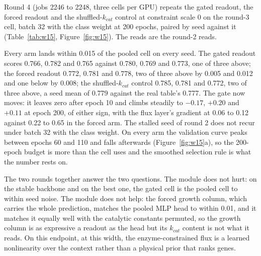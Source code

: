 Round 4 (jobs 2246 to 2248, three cells per GPU) repeats the gated readout, the forced
readout and the shuffled-$k_{cat}$ control at constraint scale 0 on the round-3 cell,
batch 32 with the class weight at 200 epochs, paired by seed against it
(Table~\ref{tab:w15}, Figure~\ref{fig:w15}). The reads are the round-2 reads.




Every arm lands within 0.015 of the pooled cell on every seed. The gated readout scores
0.766, 0.782 and 0.765 against 0.780, 0.769 and 0.773, one of three above; the forced
readout 0.772, 0.781 and 0.778, two of three above by 0.005 and 0.012 and one below by
0.008; the shuffled-$k_{cat}$ control 0.785, 0.781 and 0.772, two of three above, a seed
mean of 0.779 against the real table's 0.777. The gate now moves: it leaves zero after
epoch 10 and climbs steadily to $-0.17$, $+0.20$ and $+0.11$ at epoch 200, of either sign,
with the flux layer's gradient at 0.06 to 0.12 against 0.22 to 0.65 in the forced arm.
The stalled seed of round 2 does not recur under batch 32 with the class weight. On every
arm the validation curve peaks between epochs 60 and 110 and falls afterwards
(Figure~\ref{fig:w15}a), so the 200-epoch budget is more than the cell uses and the
smoothed selection rule is what the number rests on.

The two rounds together answer the two questions. The module does not hurt: on the
stable backbone and on the best one, the gated cell is the pooled cell to within seed
noise. The module does not help: the forced growth column, which carries the whole
prediction, matches the pooled MLP head to within 0.01, and it matches it equally well
with the catalytic constants permuted, so the growth column is as expressive a readout as
the head but its $k_{cat}$ content is not what it reads. On this endpoint, at this
width, the enzyme-constrained flux is a learned nonlinearity over the context rather than
a physical prior that ranks genes.

